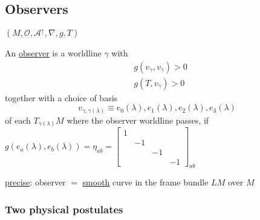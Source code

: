 \subsection{Observers} $(M,\mathcal{O}, \mathcal{A}^{\uparrow},\nabla ,g, T)$
\begin{definition}
  An \underline{observer} is a worldline $\gamma$ with
\[
\begin{aligned}
  & g(v_{\gamma}, v_{\gamma}) >  0 \\ 
  & g(T,v_{\gamma}) > 0 
\end{aligned}
\]
together with a choice of basis
\[
v_{\gamma,\gamma(\lambda)} \equiv e_0(\lambda) , e_1(\lambda), e_2(\lambda), e_3(\lambda)
\]
of each $T_{\gamma(\lambda)}M$ where the observer worldline passes, if $g(e_a(\lambda), e_b(\lambda)) = \eta_{ab} = \left[ \begin{matrix} 1 & & & \\ & -1 & & \\ & & -1 & \\ & & & -1 \end{matrix} \right]_{ab}$

\underline{precise}: observer $=$ \underline{smooth} curve in the frame bundle $LM$ over $M$
\end{definition}

\subsubsection{Two physical postulates}

